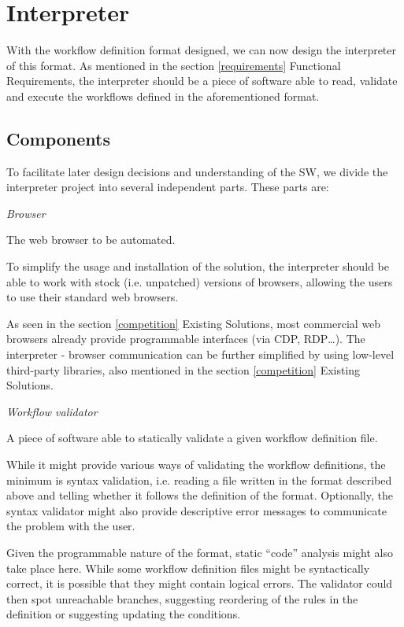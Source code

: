 \section{Interpreter}

With the workflow definition format designed, we can now design the interpreter of this format.
As mentioned in the section \ref{requirements} Functional Requirements, the interpreter should be a piece of software able to read, validate and execute the workflows defined in the aforementioned format.

\subsection{Components}

To facilitate later design decisions and understanding of the \ac{SW}, we divide the interpreter project into several independent parts.
These parts are:

\emptyline
\textit{Browser}
\smallskip
    
The web browser to be automated.
    
To simplify the usage and installation of the solution, the interpreter should be able to work with stock (i.e. unpatched) versions of browsers, allowing the users to use their standard web browsers.

As seen in the section \ref{competition} Existing Solutions, most commercial web browsers already provide programmable interfaces (via CDP, RDP\dots).
The interpreter - browser communication can be further simplified by using low-level third-party libraries, also mentioned in the section \ref{competition} Existing Solutions.

\emptyline
\textit{Workflow validator}
\smallskip

A piece of software able to statically validate a given workflow definition file.

While it might provide various ways of validating the workflow definitions, the minimum is syntax validation, i.e. reading a file written in the format described above and telling whether it follows the definition of the format.
Optionally, the syntax validator might also provide descriptive error messages to communicate the problem with the user.

Given the programmable nature of the format, static ``code'' analysis might also take place here. 
While some workflow definition files might be syntactically correct, it is possible that they might contain logical errors.
The validator could then spot unreachable branches, suggesting reordering of the rules in the definition or suggesting updating the conditions.


